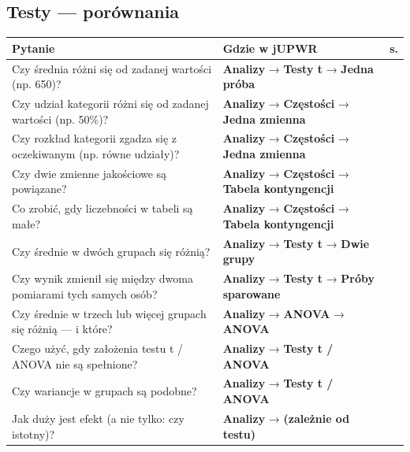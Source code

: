 \documentclass[
  polish,
  10pt,
  a4paper,
  DIV=11,
  numbers=noendperiod]{scrartcl}
\newcommand{\jmenu}[1]{{\color{upwraccent}\small #1}}
\begin{document}

\subsection{Testy --- porównania}\label{testy-poruxf3wnania}

\begin{longtable*}{@{}p{6.4cm}p{9.2cm}r@{}}
\toprule
\textbf{Pytanie} & \textbf{Gdzie w jUPWR} & \textbf{s.} \\
\midrule
\endhead
Czy średnia różni się od zadanej wartości (np. 650)? & \jmenu{\textbf{Analizy} → \textbf{Testy t} → \textbf{Jedna próba}} & \pageref{w:t-jedna-proba} \\[2pt]
Czy udział kategorii różni się od zadanej wartości (np. 50\%)? & \jmenu{\textbf{Analizy} → \textbf{Częstości} → \textbf{Jedna zmienna}} & \pageref{w:test-proporcji} \\[2pt]
Czy rozkład kategorii zgadza się z oczekiwanym (np. równe udziały)? & \jmenu{\textbf{Analizy} → \textbf{Częstości} → \textbf{Jedna zmienna}} & \pageref{w:chi2-zgodnosc} \\[2pt]
Czy dwie zmienne jakościowe są powiązane? & \jmenu{\textbf{Analizy} → \textbf{Częstości} → \textbf{Tabela kontyngencji}} & \pageref{w:chi2-niezaleznosc} \\[2pt]
Co zrobić, gdy liczebności w tabeli są małe? & \jmenu{\textbf{Analizy} → \textbf{Częstości} → \textbf{Tabela kontyngencji}} & \pageref{w:fisher} \\[2pt]
Czy średnie w dwóch grupach się różnią? & \jmenu{\textbf{Analizy} → \textbf{Testy t} → \textbf{Dwie grupy}} & \pageref{w:t-dwie-grupy} \\[2pt]
Czy wynik zmienił się między dwoma pomiarami tych samych osób? & \jmenu{\textbf{Analizy} → \textbf{Testy t} → \textbf{Próby sparowane}} & \pageref{w:t-sparowane} \\[2pt]
Czy średnie w trzech lub więcej grupach się różnią — i które? & \jmenu{\textbf{Analizy} → \textbf{ANOVA} → \textbf{ANOVA}} & \pageref{w:anova} \\[2pt]
Czego użyć, gdy założenia testu t / ANOVA nie są spełnione? & \jmenu{\textbf{Analizy} → \textbf{Testy t / ANOVA}} & \pageref{w:nieparametryczne} \\[2pt]
Czy wariancje w grupach są podobne? & \jmenu{\textbf{Analizy} → \textbf{Testy t / ANOVA}} & \pageref{w:wariancje} \\[2pt]
Jak duży jest efekt (a nie tylko: czy istotny)? & \jmenu{\textbf{Analizy} → \textbf{(zależnie od testu)}} & \pageref{w:sila-efektu} \\[2pt]
\bottomrule
\end{longtable*}
\end{document}

